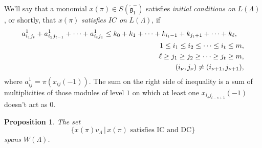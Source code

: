 \documentclass[a4paper, 10pt,oneside]{amsart}
\newtheorem{prop}[tm]{Proposition}
\begin{document}
We'll say that a monomial  $x(\pi)\in S({\tilde{{\mathfrak g}}}_1^-)$ satisfies {\em
initial conditions on} $L(\Lambda)$, or shortly, that $x(\pi)$ {\em
satisfies $IC$ on} $L(\Lambda)$, if
\begin{eqnarray}
& a_{i_1 j_t}^1+ a_{i_2 j_{t-1}}^1 +\dots +a_{i_t j_1}^1\leq
k_0+k_1+\dots+k_{i_t-1}+k_{j_t+1}+\dots+k_\ell, & \label{IC_jed}\\
& & \hspace{-72ex} 1\leq
i_1 \leq i_2\leq\dots\leq i_t\leq m, \nonumber\\
& &  \hspace{-72ex} \ell\geq j_1 \geq j_2\geq\dots\geq j_t\geq m, \nonumber\\
& &  \hspace{-72ex} (i_\nu,j_\nu)\neq (i_{\nu+1},j_{\nu+1}),
\nonumber
\end{eqnarray}
where $a_{ij}^1=\pi(x_{ij}(-1))$. The sum on the right side of inequality
is a sum of multiplicities of those modules of level $1$ on
which at least one $x_{i_s j_{t-s+1}}(-1)$ doesn't act as $0$.

\begin{prop}
The set
$$\{x(\pi)v_\Lambda \,|\, x(\pi) \textrm{ satisfies IC and DC}\}$$
spans $W(\Lambda)$.
\end{prop}
\end{document}
